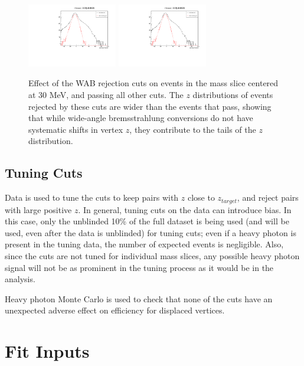 \begin{figure}[ht]
\begin{center}
    \includegraphics[width=0.35\textwidth,page=6,angle=-90]{vertexing/figs/vertcutplots}
    \includegraphics[width=0.35\textwidth,page=7,angle=-90]{vertexing/figs/vertcutplots}
\end{center}
    \caption{Effect of the WAB rejection cuts on events in the mass slice centered at 30 MeV, and passing all other cuts.
    The $z$ distributions of events rejected by these cuts are wider than the events that pass, showing that while wide-angle bremsstrahlung conversions do not have systematic shifts in vertex $z$, they contribute to the tails of the $z$ distribution.
    }
    \label{fig:wabcut_performance}
\end{figure}

\subsection{Tuning Cuts}
Data is used to tune the cuts to keep pairs with $z$ close to $z_{target}$, and reject pairs with large positive $z$.
In general, tuning cuts on the data can introduce bias.
In this case, only the unblinded 10\% of the full dataset is being used (and will be used, even after the data is unblinded) for tuning cuts; even if a heavy photon is present in the tuning data, the number of expected events is negligible.
Also, since the cuts are not tuned for individual mass slices, any possible heavy photon signal will not be as prominent in the tuning process as it would be in the analysis.

Heavy photon Monte Carlo is used to check that none of the cuts have an unexpected adverse effect on efficiency for displaced vertices.

\clearpage
\section{Fit Inputs}

